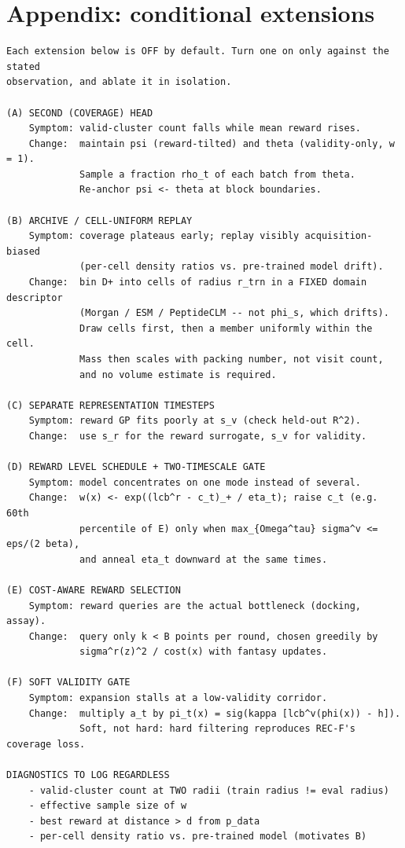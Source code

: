 \documentclass[a4paper]{article}
\begin{document}
\section*{Appendix: conditional extensions}

\begin{verbatim}
Each extension below is OFF by default. Turn one on only against the stated
observation, and ablate it in isolation.

(A) SECOND (COVERAGE) HEAD
    Symptom: valid-cluster count falls while mean reward rises.
    Change:  maintain psi (reward-tilted) and theta (validity-only, w = 1).
             Sample a fraction rho_t of each batch from theta.
             Re-anchor psi <- theta at block boundaries.

(B) ARCHIVE / CELL-UNIFORM REPLAY
    Symptom: coverage plateaus early; replay visibly acquisition-biased
             (per-cell density ratios vs. pre-trained model drift).
    Change:  bin D+ into cells of radius r_trn in a FIXED domain descriptor
             (Morgan / ESM / PeptideCLM -- not phi_s, which drifts).
             Draw cells first, then a member uniformly within the cell.
             Mass then scales with packing number, not visit count,
             and no volume estimate is required.

(C) SEPARATE REPRESENTATION TIMESTEPS
    Symptom: reward GP fits poorly at s_v (check held-out R^2).
    Change:  use s_r for the reward surrogate, s_v for validity.

(D) REWARD LEVEL SCHEDULE + TWO-TIMESCALE GATE
    Symptom: model concentrates on one mode instead of several.
    Change:  w(x) <- exp((lcb^r - c_t)_+ / eta_t); raise c_t (e.g. 60th
             percentile of E) only when max_{Omega^tau} sigma^v <= eps/(2 beta),
             and anneal eta_t downward at the same times.

(E) COST-AWARE REWARD SELECTION
    Symptom: reward queries are the actual bottleneck (docking, assay).
    Change:  query only k < B points per round, chosen greedily by
             sigma^r(z)^2 / cost(x) with fantasy updates.

(F) SOFT VALIDITY GATE
    Symptom: expansion stalls at a low-validity corridor.
    Change:  multiply a_t by pi_t(x) = sig(kappa [lcb^v(phi(x)) - h]).
             Soft, not hard: hard filtering reproduces REC-F's coverage loss.

DIAGNOSTICS TO LOG REGARDLESS
    - valid-cluster count at TWO radii (train radius != eval radius)
    - effective sample size of w
    - best reward at distance > d from p_data
    - per-cell density ratio vs. pre-trained model (motivates B)
\end{verbatim}
\end{document}
